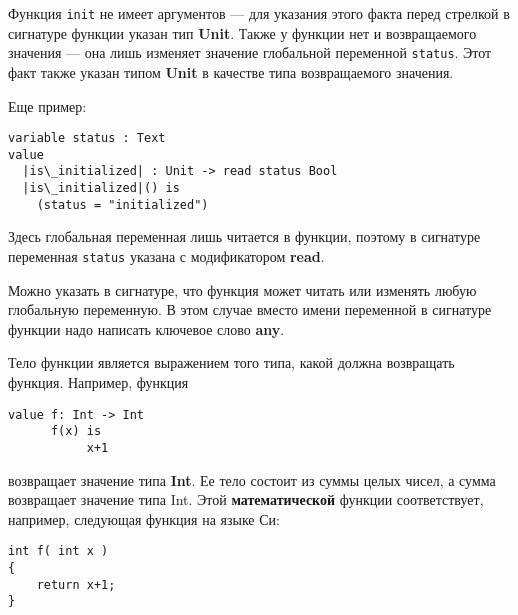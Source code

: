 Функция \texttt{init} не имеет аргументов --- для указания этого факта перед стрелкой в сигнатуре функции указан тип \textbf{Unit}. Также у функции нет и возвращаемого значения --- она лишь изменяет значение глобальной переменной \texttt{status}. Этот факт также указан типом \textbf{Unit} в качестве типа возвращаемого значения.

Еще пример:
\begin{lstlisting}[escapechar={|}]
variable status : Text
value
  |is\_initialized| : Unit -> read status Bool
  |is\_initialized|() is
	(status = "initialized")	
\end{lstlisting}

Здесь глобальная переменная лишь читается в функции, поэтому в сигнатуре переменная \texttt{status} указана с модификатором \textbf{read}.

Можно указать в сигнатуре, что функция может читать или изменять любую глобальную переменную. В этом случае вместо имени переменной в сигнатуре функции надо написать ключевое слово \textbf{any}.

Тело функции является выражением того типа, какой должна возвращать функция. Например, функция
\begin{lstlisting}
value f: Int -> Int
      f(x) is
	       x+1
\end{lstlisting}
возвращает значение типа \textbf{Int}. Ее тело состоит из суммы целых чисел, а сумма возвращает значение типа Int. Этой \textbf{математической} функции соответствует, например, следующая функция на языке Си:
\begin{lstlisting}
int f( int x )
{
    return x+1;
}
\end{lstlisting}

